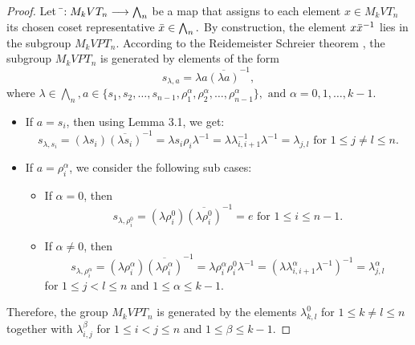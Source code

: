\documentclass[preprint]{elsarticle}
\begin{document}
\begin{proof}
    Let $\Bar{}: M_kVT_n \longrightarrow \bigwedge_n $ be a map that assigns to each element $x \in M_kVT_n$ its chosen coset representative $\Bar{x} \in \bigwedge_n.$ By construction, the element $x \Bar{x}^{-1}$ lies in the subgroup $M_kVPT_n$. According to the Reidemeister Schreier theorem \cite[Theorem~2.7]{MKS}, the subgroup $M_kVPT_n$ is generated by elements of the form 
    \[ s_{\lambda,a} = \lambda a \overline{(\lambda a)}^{-1},\] where $\lambda \in \bigwedge_n,  a \in \{s_1,s_2,\dots,s_{n-1},\rho_1^{\alpha},\rho_2^{\alpha},\dots,\rho_{n-1}^{\alpha}\}, \text{ and } \alpha =0,1,\dots,k-1. $
    \begin{itemize}
        \item [Case 1:]  If $a=s_i$, then using Lemma 3.1, we get:
        \[s_{\lambda,s_i}= (\lambda s_i)\overline{(\lambda s_i)}^{-1}=\lambda s_i \rho_i \lambda^{-1}= \lambda \lambda_{i,i+1}^{-1} \lambda^{-1} = \lambda_{j,l} \text{ for } 1\leq j \neq l \leq n.\]
        \item [Case 2:] If $a=\rho_i^{\alpha}$, we consider the following sub cases:
        \begin{itemize}
            \item[(a)] If $\alpha=0$, then  
            \[s_{\lambda,\rho_i^0}=(\lambda \rho_i^0)\overline{(\lambda \rho_i^0)}^{-1}=e \text{ for } 1\leq i \leq n-1.\]
            \item[(b)] If $\alpha \neq 0$, then
            \[s_{\lambda,\rho_i^{\alpha}}=(\lambda \rho_i^{\alpha})\overline{(\lambda \rho_i^{\alpha})}^{-1}=\lambda \rho_i^{\alpha} \rho_i^{0} \lambda^{-1} = (\lambda \lambda_{i,i+1}^{\alpha} \lambda^{-1})^{-1} =\lambda_{j,l}^{\alpha}\] for $1\leq j < l \leq n$ and $1\leq \alpha \leq k-1.$
        \end{itemize}
    \end{itemize}
    Therefore, the group $M_kVPT_n$ is generated by the elements $\lambda_{k,l}^0$ for $1 \leq k \neq l \leq n$ together with $\lambda_{i,j}^{\beta}$ for $1 \leq i < j \leq n$ and $1 \leq \beta \leq k-1.$
    

\end{proof}
\end{document}

